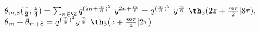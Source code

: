 \begin{equation}  
\begin{array}{l}
  \theta_{m,8} ({\tau\over 2}, {z\over 4}) = \sum_{n\in\Z}
  q^{(2n+{m\over 8})^2} ~y^{2n+{m\over 8}} = q^{({m\over 8})^2}
  ~y^{m\over 8} ~\th_3(2z+{m\tau\over 2}| 8\tau),\\
   \theta_m +  \theta_{m+8} = q^{({m\over 8})^2} y^{m\over 8}
  ~\th_3(z+{m\tau\over 4} |2\tau).
  \end{array}
\end{equation}

